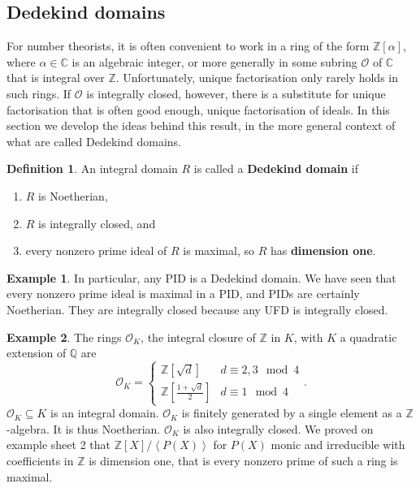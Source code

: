 \documentclass{article}
\newcommand{\Z}{\mathbb{Z}}
\newcommand{\Q}{\mathbb{Q}}
\newcommand{\C}{\mathbb{C}}
\newcommand{\rb}[1]{\left( #1 \right)}
\renewcommand{\sb}[1]{\left[ #1 \right]}
\newcommand{\ab}[1]{\left\langle #1 \right\rangle}
\theoremstyle{definition}\newtheorem{definition}{Definition}[subsection]
\theoremstyle{definition}\newtheorem{remark}[definition]{Remark}
\theoremstyle{definition}\newtheorem*{example}{Example}
\theoremstyle{definition}\newtheorem*{note}{Note}
\begin{document}
\subsection{Dedekind domains}

For number theorists, it is often convenient to work in a ring of the form $ \Z\sb{\alpha} $, where $ \alpha \in \C $ is an algebraic integer, or more generally in some subring $ \mathcal{O} $ of $ \C $ that is integral over $ \Z $. Unfortunately, unique factorisation only rarely holds in such rings. If $ \mathcal{O} $ is integrally closed, however, there is a substitute for unique factorisation that is often good enough, unique factorisation of ideals. In this section we develop the ideas behind this result, in the more general context of what are called Dedekind domains.

\begin{definition}
An integral domain $ R $ is called a \textbf{Dedekind domain} if
\begin{enumerate}
\item $ R $ is Noetherian,
\item $ R $ is integrally closed, and
\item every nonzero prime ideal of $ R $ is maximal, so $ R $ has \textbf{dimension one}.
\end{enumerate}
\end{definition}

\begin{example}
In particular, any PID is a Dedekind domain. We have seen that every nonzero prime ideal is maximal in a PID, and PIDs are certainly Noetherian. They are integrally closed because any UFD is integrally closed.
\end{example}

\begin{example}
The rings $ \mathcal{O}_K $, the integral closure of $ \Z $ in $ K $, with $ K $ a quadratic extension of $ \Q $ are
$$ \mathcal{O}_K = \begin{cases} \Z\sb{\sqrt{d}} & d \equiv 2, 3 \mod 4 \\ \Z\sb{\tfrac{1 + \sqrt{d}}{2}} & d \equiv 1 \mod 4 \end{cases}. $$
$ \mathcal{O}_K \subseteq K $ is an integral domain. $ \mathcal{O}_K $ is finitely generated by a single element as a $ \Z $-algebra. It is thus Noetherian. $ \mathcal{O}_K $ is also integrally closed. We proved on example sheet 2 that $ \Z\sb{X} / \ab{P\rb{X}} $ for $ P\rb{X} $ monic and irreducible with coefficients in $ \Z $ is dimension one, that is every nonzero prime of such a ring is maximal.
\end{example}
\end{document}
